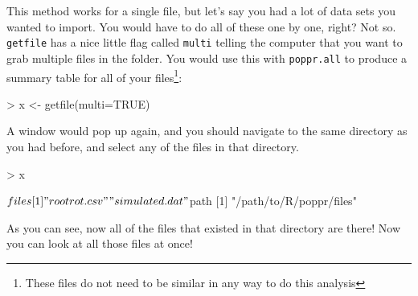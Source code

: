 \documentclass[letterpaper]{article}
\begin{document}
This method works for a single file, but let's say you had a lot of data sets you wanted to import. You would have to do all of these one by one, right? Not so. \texttt{getfile} has a nice little flag called \texttt{multi} telling the computer that you want to grab multiple files in the folder. You would use this with \texttt{poppr.all} to produce a summary table for all of your files\footnote{These files do not need to be similar in any way to do this analysis}:
\begin{Schunk}
\begin{Sinput}
> x <- getfile(multi=TRUE)
\end{Sinput}
\end{Schunk}
A window would pop up again, and you should navigate to the same directory as you had before, and select any of the files in that directory. 
\begin{Schunk}
\begin{Sinput}
> x
\end{Sinput}
\end{Schunk}
\begin{Schunk}
\begin{Soutput}
$files
[1] "rootrot.csv"   "simulated.dat"

$path
[1] "/path/to/R/poppr/files"
\end{Soutput}
\end{Schunk}
As you can see, now all of the files that existed in that directory are there! Now you can look at all those files at once!
\begin{Schunk}
\end{Schunk}
\end{document}

